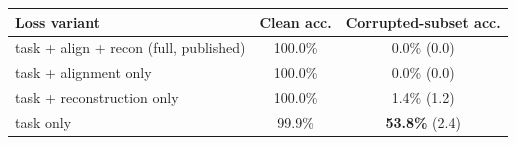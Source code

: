 \begin{tabular}{lcc}
\toprule
\textbf{Loss variant} & \textbf{Clean acc.} & \textbf{Corrupted-subset acc.} \\
\midrule
task + align + recon (full, published) & 100.0\% & 0.0\% (0.0) \\
task + alignment only & 100.0\% & 0.0\% (0.0) \\
task + reconstruction only & 100.0\% & 1.4\% (1.2) \\
task only & 99.9\% & \textbf{53.8\%} (2.4) \\
\bottomrule
\end{tabular}
